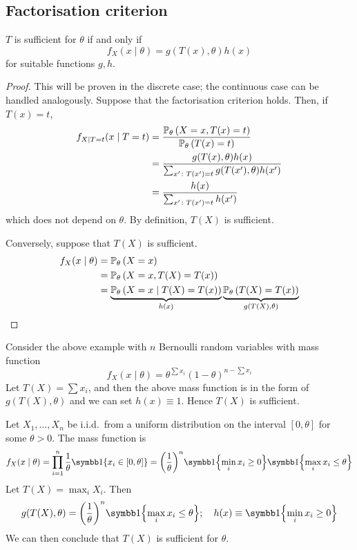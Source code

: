 \subsection{Factorisation criterion}
\begin{theorem}
	\( T \) is sufficient for \( \theta \) if and only if
	\[
		f_X(x \mid \theta) = g(T(x), \theta) h(x)
	\]
	for suitable functions \( g,h \).
\end{theorem}
\begin{proof}
	This will be proven in the discrete case; the continuous case can be handled analogously.
	Suppose that the factorisation criterion holds.
	Then, if \( T(x) = t \),
	\begin{align*}
		f_{X \mid T = t}(x \mid T = t) & = \frac{\mathbb{P}_{\theta}\left({X = x, T(x) = t}\right)}{\mathbb{P}_{\theta}\left({T(x) = t}\right)}             \\
		                               & = \frac{g(T(x),\theta)h(x)}{\sum_{x' \colon T(x') = t} g(T(x'),\theta)h(x')} \\
		                               & = \frac{h(x)}{\sum_{x' \colon T(x') = t} h(x')}
	\end{align*}
	which does not depend on \( \theta \).
	By definition, \( T(X) \) is sufficient.

	Conversely, suppose that \( T(X) \) is sufficient.
	\begin{align*}
		f_X(x \mid \theta) & = \mathbb{P}_{\theta}\left({X = x}\right)                                                                                                \\
		                   & = \mathbb{P}_{\theta}\left({X = x, T(X) = T(x)}\right)                                                                                   \\
		                   & = \underbrace{\mathbb{P}_{\theta}\left({X = x \mid T(X) = T(x)}\right)}_{h(x)} \underbrace{\mathbb{P}_{\theta}\left({T(X) = T(x)}\right)}_{g(T(X), \theta)}
	\end{align*}
\end{proof}
\begin{example}
	Consider the above example with \( n \) Bernoulli random variables with mass function
	\[
		f_X(x \mid \theta) = \theta^{\sum x_i} (1-\theta)^{n - \sum x_i}
	\]
	Let \( T(X) = \sum x_i \), and then the above mass function is in the form of \( g(T(X), \theta) \) and we can set \( h(x) \equiv 1 \).
	Hence \( T(X) \) is sufficient.
\end{example}
\begin{example}
	Let \( X_1, \dots, X_n \) be i.i.d.\ from a uniform distribution on the interval \( [0,\theta] \) for some \( \theta > 0 \).
	The mass function is
	\[
		f_X(x \mid \theta) = \prod_{i=1}^n \frac{1}{\theta} \symbb 1\qty{x_i \in [0,\theta]} = \qty(\frac{1}{\theta})^{n} \symbb 1\qty{\min_i x_i \geq 0} \symbb 1\qty{\max_i x_i \leq \theta}
	\]
	Let \( T(X) = \max_i X_i \).
	Then
	\[
		g(T(X), \theta) = \qty(\frac{1}{\theta})^n \symbb 1\qty{\max_i x_i \leq \theta};\quad h(x) \equiv \symbb 1\qty{\min_i x_i \geq 0}
	\]
	We can then conclude that \( T(X) \) is sufficient for \( \theta \).
\end{example}


